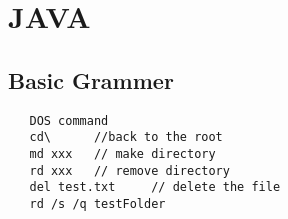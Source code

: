 
\chapter{JAVA}

\section{Basic Grammer}



\begin{lstlisting}
   DOS command
   cd\      //back to the root
   md xxx   // make directory
   rd xxx   // remove directory
   del test.txt     // delete the file
   rd /s /q testFolder
\end{lstlisting}